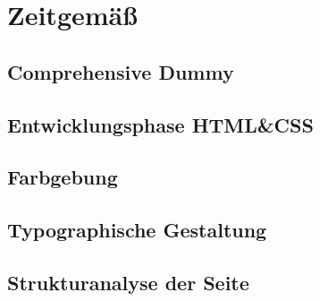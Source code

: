 \section{Zeitgemäß}

	\subsection{Comprehensive Dummy}

	\subsection{Entwicklungsphase HTML&CSS}

	\subsection{Farbgebung}

	\subsection{Typographische Gestaltung}

	\subsection{Strukturanalyse der Seite}